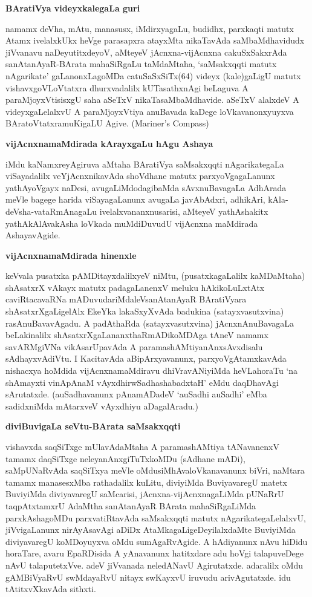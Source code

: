 {\medskip
\noindent
{\large\bf BAratiVya videyxkalegaLa guri}}\label{page22}
\medskip

\noindent
namamx deVha, mAtu, manasusx, iMdirxyagaLu, budidhx, parxkaqti matutx Atamx ivelalxkUkx heVge parasapxra atayxMta nikaTavAda saMbaMdhavidudx jiVvanavu naDeyutitxdeyoV, aMteyeV jAcnxna-vijAcnxna cakuSxSakxrAda sanAta\-nAyaR-BArata mahaSiRgaLu taMdaMtaha, `saMsakxqqti matutx nAgarikate' gaLanonxLagoMDa catu\-SaSxSiTx(64) videyx (kale)gaLigU matutx vishavxgoVLoVtatxra dhurxvadalilx kUTasathxnAgi beLaguva A paraMjoyxVti\-sisxgU saha aSeTxV nikaTasaMbaMdhavide. aSeTxV
alalxdeV A videyxgaLelalxvU A paraMjoyxVtiya anuBavada kaDege loVka\-vanonxyuyxva BAratoVtatxramuKigaLU Agive. {(\rm Mariner's Compass)}

{\medskip
\noindent
{\large\bf vijAcnxnamaMdirada kArayxgaLu hAgu Ashaya}}\label{page22a}
\medskip

\noindent
iMdu kaNamxreyAgiruva aMtaha BAratiVya saMsakxqqti nAgarikategaLa viSayadalilx veYjAcnxnika\-vAda shoVdhane matutx parxyoVgagaLanunx yathAyoVgayx naDesi, avugaLiM\-dodagi\-baMda sAvxnuBavagaLa AdhArada meVle bagege harida viSayagaLanunx avugaLa javAbAdxri, adhikAri, kAla-deVsha-vataRmAnagaLu ivelalx\-vananxnu\-sarisi, aMteyeV yathAshakitx yathAkAlAvakAsha loVkada muMdiDuvudU vijAcnxna maMdirada Ashaya\-vAgide.

{\medskip
\noindent
{\large\bf vijAcnxnamaMdirada hinenxle}}
\medskip

\noindent
keVvala pusatxka pAMDitayxdalilxyeV niMtu, (pusatxkagaLalilx kaMDaMtaha) shAsatxrX vAkayx matutx padagaLanenxV meluku hAkikoLuLxtAtx caviRtacavaRNa mADuvudariMdaleV\break sanAtanAyaR BAratiVyara shAsatxrXgaLi\-gelAlx EkeYka lakaSxyXvAda badukina (satayx\-vasutxvina) rasAnuBavavAgadu. A padAthaRda (satayxvasutxvina) jAcnxnAnu\-BavagaLa beLakinalilx shAsatxrXgaLananxthaRmADikoMDAga tAneV namamx 
savARMgiVNa vikAsarUpavAda A parama\-shAMti\-yanAnxsAvxdisalu sAdhayxvAdiVtu. I KacitavAda aBipArxyavanunx, parxyoVgAtamxkavAda nishacxya hoMdida\- vijAcnxnamaMdiravu dhiVravANiyiMda heVLahoraTu `na shAmayxti vinApAnaM vAyxdhirwSadha\-shabadxtaH'\label{25} eMdu daqDhavAgi sArutatxde. (auSadhavanunx pAnamADadeV `auSadhi auSadhi' eMba sadidxniMda mAtarx\-veV vAyxdhiyu aDagalAradu.)

{\bigskip
\noindent
{\large\bf diviBuvigaLa seVtu-BArata saMsakxqqti}}\label{page23}
\medskip

\noindent
vishavxda saqSiTxge mUlavAdaMtaha A paramashAMtiya tANavanenxV tamamx daqSiTxge nele\-yanAnxgiTuTxkoMDu (sAdhane mADi), saMpUNaRvAda saqSiTxya meVle oMdu\break siMhAvaloVkanavanunx biVri, naMtara tamamx manasesxMba rathadalilx kuLitu, diviyiMda BuviyavaregU matetx BuviyiMda diviyavaregU saMcarisi, jAcnxna-vijAcnxna\-gaLiMda pUNaRrU taqpAtxtamxrU AdaMtha sanAtanAyaR BArata mahaSiRgaLiMda parxkAsha\-goMDu parxvatiRtavAda saMsakxqqti matutx nAgarikategaLelalxvU, jiVvigaLanunx nirAyAsavAgi aDiDx AtaMkagaLi\-geDeyilalxdaMte BuviyiMda diviyavaregU koMDoyuyxva oMdu sumAgaRvAgide. A hAdiyanunx nAvu hiDidu horaTare, avaru EpaRDisida A yAnavanunx hatitxdare adu hoVgi talapuveDege nAvU talaputetxVve. adeV jiVvanada neledANavU Agirutatxde. adaralilx oMdu gAMBiVyaRvU swMdayaRvU nitayx swKayxvU iruvudu arivAgutatxde. idu tAtitxvXkavAda sithxti.

